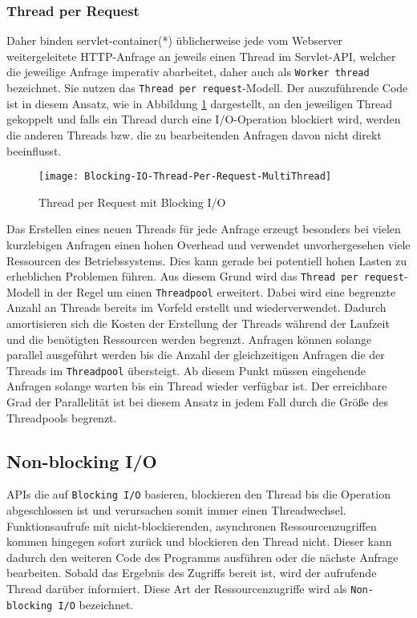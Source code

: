 \subsubsection{Thread per Request}
\label{subsubsec:thread per request}
Daher binden \Gls{servlet-container}(*) üblicherweise jede vom Webserver weitergeleitete HTTP-Anfrage an jeweils einen
Thread im Servlet-API, welcher die jeweilige Anfrage imperativ abarbeitet, daher auch als \verb|Worker thread| bezeichnet.
Sie nutzen das \verb|Thread per request|-Modell.
Der auszuführende Code ist in diesem Ansatz, wie in Abbildung \ref{fig:blocking_thread_per_request} dargestellt,
an den jeweiligen Thread gekoppelt und falls ein Thread durch eine I/O-Operation blockiert wird, werden
die anderen Threads bzw. die zu bearbeitenden Anfragen davon nicht direkt beeinflusst.
\begin{figure}[ht!]
  \centering
  \texttt{[image: Blocking-IO-Thread-Per-Request-MultiThread]}
  \caption{Thread per Request mit Blocking I/O}
  \label{fig:blocking_thread_per_request}
\end{figure}

Das Erstellen eines neuen Threads für jede Anfrage erzeugt besonders bei vielen kurzlebigen Anfragen einen hohen Overhead und
verwendet unvorhergesehen viele Ressourcen des Betriebssystems. Dies kann gerade bei potentiell hohen Lasten zu erheblichen Problemen
führen.
Aus diesem Grund wird das \verb|Thread per request|-Modell in der Regel um einen \verb|Threadpool| erweitert.
Dabei wird eine begrenzte Anzahl an Threads bereits im Vorfeld erstellt und wiederverwendet.
Dadurch amortisieren sich die Kosten der Erstellung der Threads während der Laufzeit und die benötigten Ressourcen werden begrenzt.
Anfragen können solange parallel ausgeführt werden bis die Anzahl der gleichzeitigen Anfragen die der Threads im \verb|Threadpool|
übersteigt.
Ab diesem Punkt müssen eingehende Anfragen solange warten bis ein Thread wieder verfügbar ist.
Der erreichbare Grad der Parallelität ist bei diesem Ansatz in jedem Fall durch die Größe des Threadpools begrenzt.
\newpage
\subsection{Non-blocking I/O}
\label{subsec:nonblocking-i/o}
APIs die auf \verb|Blocking I/O| basieren, blockieren den Thread bis die Operation abgeschlossen ist und verursachen somit
immer einen Threadwechsel.
Funktionsaufrufe mit nicht-blockierenden, asynchronen Ressourcenzugriffen kommen hingegen sofort zurück und blockieren den Thread nicht.
Dieser kann dadurch den weiteren Code des Programms ausführen oder die nächste Anfrage bearbeiten.
Sobald das Ergebnis des Zugriffs bereit ist, wird der aufrufende Thread darüber informiert.
Diese Art der Ressourcenzugriffe wird als \verb|Non-blocking I/O| bezeichnet.


